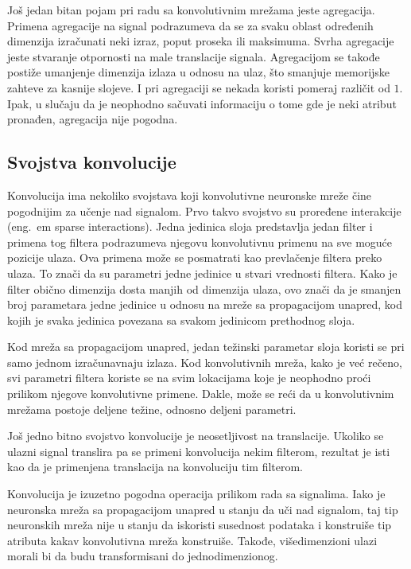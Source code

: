 \par 
Još jedan bitan pojam pri radu sa konvolutivnim mrežama jeste agregacija. Primena agregacije na signal podrazumeva da se za svaku oblast određenih dimenzija izračunati neki izraz, poput proseka ili maksimuma. Svrha agregacije jeste stvaranje otpornosti na male translacije signala. Agregacijom se takođe postiže umanjenje dimenzija izlaza u odnosu na ulaz, što smanjuje memorijske zahteve za kasnije slojeve. I pri agregaciji se nekada koristi pomeraj različit od $1$. Ipak, u slučaju da je neophodno sačuvati informaciju o tome gde je neki atribut pronađen, agregacija nije pogodna.
\subsection{Svojstva konvolucije}
Konvolucija ima nekoliko svojstava koji konvolutivne neuronske mreže čine pogodnijim za učenje nad signalom. Prvo takvo svojstvo su proređene interakcije (eng.~{em sparse interactions}). Jedna jedinica sloja predstavlja jedan filter i primena tog filtera podrazumeva njegovu konvolutivnu primenu na sve moguće pozicije ulaza. Ova primena može se posmatrati kao prevlačenje filtera preko ulaza. To znači da su parametri jedne jedinice u stvari vrednosti filtera. Kako je filter obično dimenzija dosta manjih od dimenzija ulaza, ovo znači da je smanjen broj parametara jedne jedinice u odnosu na mreže sa propagacijom unapred, kod kojih je svaka jedinica povezana sa svakom jedinicom prethodnog sloja. 
\par 
Kod mreža sa propagacijom unapred, jedan težinski parametar sloja koristi se pri samo jednom izračunavnaju izlaza. Kod konvolutivnih mreža, kako je već rečeno, svi parametri filtera koriste se na svim lokacijama koje je neophodno proći prilikom njegove konvolutivne primene. Dakle, može se reći da u konvolutivnim mrežama postoje deljene težine, odnosno deljeni parametri.
\par 
Još jedno bitno svojstvo konvolucije je neosetljivost na translacije. Ukoliko se ulazni signal translira pa se primeni konvolucija nekim filterom, rezultat je isti kao da je primenjena translacija na konvoluciju tim filterom.
\par 
Konvolucija je izuzetno pogodna operacija prilikom rada sa signalima. Iako je neuronska mreža sa propagacijom unapred u stanju da uči nad signalom, taj tip neuronskih mreža nije u stanju da iskoristi susednost podataka i konstruiše tip atributa kakav konvolutivna mreža konstruiše. Takođe, višedimenzioni ulazi morali bi da budu transformisani do jednodimenzionog. 
